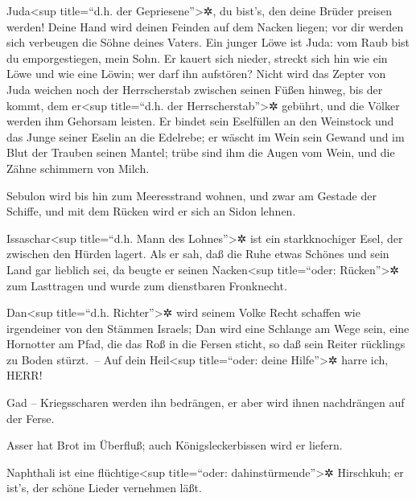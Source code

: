  Juda\textless sup title=``d.h. der
Gepriesene''\textgreater✲, du bist's, den deine Brüder preisen werden!
Deine Hand wird deinen Feinden auf dem Nacken liegen; vor dir werden
sich verbeugen die Söhne deines Vaters.  Ein junger Löwe
ist Juda: vom Raub bist du emporgestiegen, mein Sohn. Er kauert sich
nieder, streckt sich hin wie ein Löwe und wie eine Löwin; wer darf ihn
aufstören?  Nicht wird das Zepter von Juda weichen noch
der Herrscherstab zwischen seinen Füßen hinweg, bis der kommt, dem
er\textless sup title=``d.h. der Herrscherstab''\textgreater✲ gebührt,
und die Völker werden ihm Gehorsam leisten.  Er bindet
sein Eselfüllen an den Weinstock und das Junge seiner Eselin an die
Edelrebe; er wäscht im Wein sein Gewand und im Blut der Trauben seinen
Mantel;  trübe sind ihm die Augen vom Wein, und die Zähne
schimmern von Milch.

 Sebulon wird bis hin zum Meeresstrand wohnen, und zwar
am Gestade der Schiffe, und mit dem Rücken wird er sich an Sidon lehnen.

 Issaschar\textless sup title=``d.h. Mann des
Lohnes''\textgreater✲ ist ein starkknochiger Esel, der zwischen den
Hürden lagert.  Als er sah, daß die Ruhe etwas Schönes
und sein Land gar lieblich sei, da beugte er seinen Nacken\textless sup
title=``oder: Rücken''\textgreater✲ zum Lasttragen und wurde zum
dienstbaren Fronknecht.

 Dan\textless sup title=``d.h. Richter''\textgreater✲
wird seinem Volke Recht schaffen wie irgendeiner von den Stämmen
Israels;  Dan wird eine Schlange am Wege sein, eine
Hornotter am Pfad, die das Roß in die Fersen sticht, so daß sein Reiter
rücklings zu Boden stürzt.~--  Auf dein Heil\textless sup
title=``oder: deine Hilfe''\textgreater✲ harre ich, HERR!

 Gad -- Kriegsscharen werden ihn bedrängen, er aber wird
ihnen nachdrängen auf der Ferse.

 Asser hat Brot im Überfluß; auch Königsleckerbissen wird
er liefern.

 Naphthali ist eine flüchtige\textless sup title=``oder:
dahinstürmende''\textgreater✲ Hirschkuh; er ist's, der schöne Lieder
vernehmen läßt.

